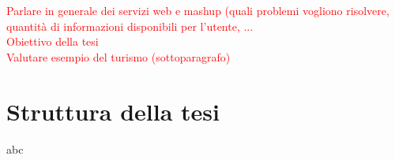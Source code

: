 \textcolor{red}{Parlare in generale dei servizi web e mashup (quali problemi vogliono risolvere, quantit\`a di informazioni disponibili per l'utente, ...\\
Obiettivo della tesi\\
Valutare esempio del turismo (sottoparagrafo)}

\section{Struttura della tesi\label{sec:struttura-tesi}}

abc